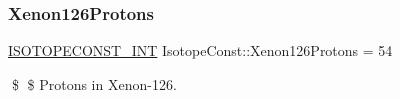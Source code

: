 \subsubsection{\texorpdfstring{Xenon126\+Protons}{Xenon126Protons}}
{\footnotesize\ttfamily \mbox{\hyperlink{group___isotope_const-_macros_ga5f18360b3e99483a35c32d789e62621c}{I\+S\+O\+T\+O\+P\+E\+C\+O\+N\+S\+T\+\_\+\+I\+NT}} Isotope\+Const\+::\+Xenon126\+Protons = 54}

\$ \$ Protons in Xenon-\/126. 